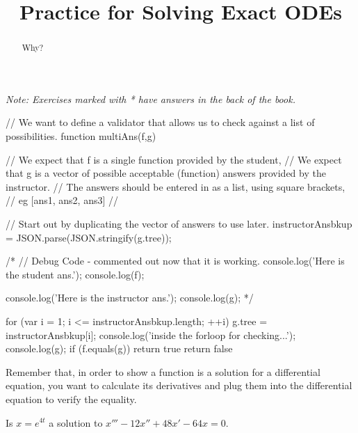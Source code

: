 \documentclass{ximera}
\title{Practice for Solving Exact ODEs}
\begin{document}
\begin{abstract}
    Why?
\end{abstract}
\maketitle

\noindent
\emph{Note: Exercises marked with * have answers in the back of the book.}


\begin{javascript}
// We want to define a validator that allows us to check against a list of possibilities.
function multiAns(f,g) {
    // We expect that f is a single function provided by the student,
    // We expect that g is a vector of possible acceptable (function) answers provided by the instructor.
    //      The answers should be entered in as a list, using square brackets,
    //      eg [ans1, ans2, ans3]
    //
    
    // Start out by duplicating the vector of answers to use later.
    instructorAnsbkup = JSON.parse(JSON.stringify(g.tree));
    
    /* //   Debug Code - commented out now that it is working.
    console.log('Here is the student ans.');
    console.log(f);
    
    console.log('Here is the instructor ans.');
    console.log(g);
    */
    
    for (var i = 1; i <= instructorAnsbkup.length; ++i) {
        g.tree = instructorAnsbkup[i];
        console.log('inside the forloop for checking...');
        console.log(g);
        if (f.equals(g)){
            return true
        }
    }
return false
}

\end{javascript}


\begin{exercise}
    \begin{hint}
        Remember that, in order to show a function is a solution for a differential equation, you want to calculate its derivatives and plug them into the differential equation to verify the equality.
    \end{hint}
    Is $x = e^{4t}$ a solution to $x'''-12 x'' + 48 x' - 64 x = 0$.
    \begin{multipleChoice}
    \end{multipleChoice}
\end{exercise}
\end{document}
